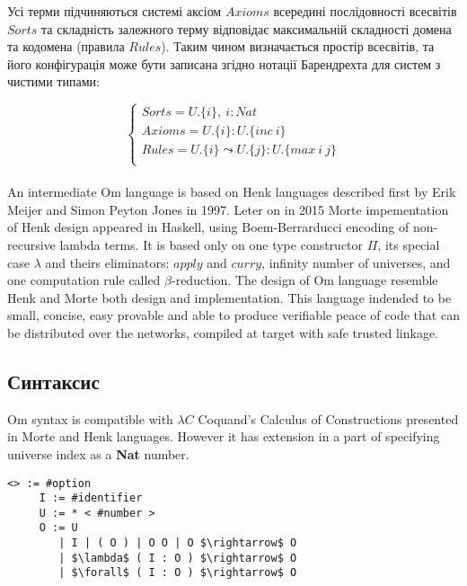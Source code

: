 \begin{definition}
\begin{definition}
\begin{definition}
\begin{definition}
Усі терми підчиняються системі аксіом $Axioms$ всередині послідовності всесвітів $Sorts$
та складність залежного терму відповідає максимальній складності домена та кодомена (правила $Rules$).
Таким чином визначається простір всесвітів, та його конфігурація може бути записана
згідно нотації Барендрехта для систем з чистими типами:

$$
\begin{cases}
    Sorts = U.\{i\},\ i : Nat\\
    Axioms = U.\{i\} : U.\{inc\ i\}\\
    Rules = U.\{i\} \leadsto U.\{j\} : U.\{max\ i\ j\}\\
\end{cases}
$$

\paragraph{}
An intermediate Om language is based on Henk\cite{henk} languages described first
by Erik Meijer and Simon Peyton Jones in 1997. Leter on in 2015 Morte impementation
of Henk design appeared in Haskell, using Boem-Berrarducci encoding of non-recursive lambda terms.
It is based only on one type constructor $\Pi$, its special case $\lambda$ and theirs eliminators:
$apply$ and $curry$, infinity number of universes,
and one computation rule called $\beta$-reduction.
The design of Om language resemble Henk and Morte both
design and implementation. This language indended to be small, concise, easy provable
and able to produce verifiable peace of code that can be distributed over the networks,
compiled at target with safe trusted linkage.

\newpage
\subsection{Синтаксис}
Om syntax is compatible with $\lambda C$ Coquand's Calculus of Constructions presented
in Morte and Henk languages. However it has extension in a part of specifying
universe index as a {\bf Nat} number.

\vspace{0.5cm}
\begin{lstlisting}[mathescape=true]
    <> := #option
     I := #identifier
     U := * < #number >
     O := U
        | I | ( O ) | O O | O $\rightarrow$ O
        | $\lambda$ ( I : O ) $\rightarrow$ O
        | $\forall$ ( I : O ) $\rightarrow$ O
\end{lstlisting}


\end{definition}
\end{definition}
\end{definition}
\end{definition}
